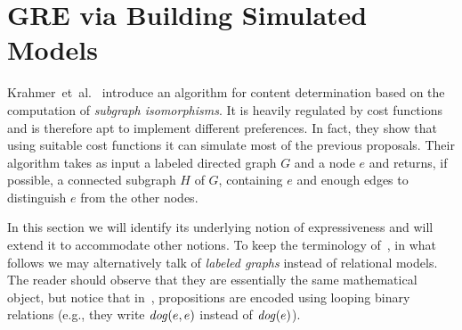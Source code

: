 \newcommand{\instFun}[2]{\texttt{#1}\ensuremath{_{#2}}\xspace}

\section{GRE via Building Simulated Models}\label{sec:krahmer}

Krahmer~et~al.~\cite{Krahmer2003} introduce an algorithm for
content determination based on the computation of \emph{subgraph isomorphisms}.
It is heavily regulated by cost functions and is therefore apt to implement
different preferences. In fact, they show that using suitable cost functions it
can simulate most of the previous proposals. Their algorithm takes as input
a labeled directed graph $G$ and a node $e$ and returns, if possible,
a connected subgraph $H$ of $G$, containing $e$ and enough edges to
distinguish $e$ from the other nodes.

In this section we will identify its
underlying notion of expressiveness and  will extend it to accommodate other notions.
To keep the terminology of~\cite{Krahmer2003}, in what follows
we may alternatively talk of \emph{labeled graphs} instead of relational
models. The reader should observe that they are essentially the same
mathematical object, but notice that in~\cite{Krahmer2003},  propositions are encoded using
looping binary relations (e.g., they write $\mathit{dog}(e,e)$ instead of $\mathit{dog}(e)$).


